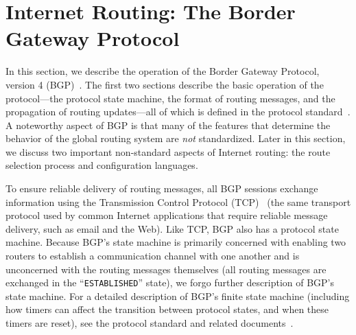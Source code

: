
\section{Internet Routing: The Border Gateway Protocol}\label{sec:bgp}

In this section, we describe the operation of the Border Gateway
Protocol, version 4 (BGP)~\cite{rfc1771,id-bgp4}.  The first two
sections describe the basic 
operation of the protocol---the protocol state machine, the format of
routing messages, and the propagation of routing updates---all of which
is defined in the protocol standard~\cite{rfc1771}.  A noteworthy aspect
of BGP is that many of the features that determine the behavior of the
global routing system are {\em not} standardized.  Later in this section, we
discuss two important non-standard aspects of Internet routing:
the route selection process and configuration languages.

To ensure reliable delivery of routing messages, all BGP sessions
exchange information using the Transmission Control Protocol
(TCP)~\cite{rfc793} 
(the same transport protocol used by common Internet applications that
require reliable message delivery, such as email and the Web).  Like
TCP, BGP also has a protocol state machine. Because BGP's state machine
is primarily concerned with enabling two routers to establish a
communication channel with one another and is unconcerned with the
routing messages themselves (all routing messages are exchanged in the
``{\tt ESTABLISHED}'' state), we forgo further description of BGP's
state machine.  For a detailed description of BGP's finite state machine
(including how timers can affect the transition between protocol states,
and when these timers are reset), see the protocol standard and related
documents~\cite{Beijnum2002, rfc1771, Stewart98}.





